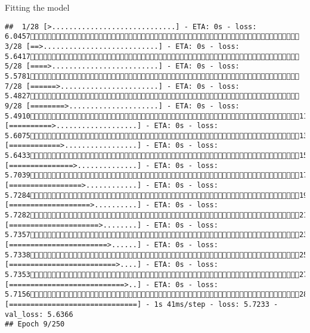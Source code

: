 \documentclass[
  ignorenonframetext,
]{beamer}
\begin{document}
\begin{frame}[fragile]{Fitting the model}
\begin{verbatim}
##  1/28 [>.............................] - ETA: 0s - loss: 6.0457 3/28 [==>...........................] - ETA: 0s - loss: 5.6417 5/28 [====>.........................] - ETA: 0s - loss: 5.5781 7/28 [======>.......................] - ETA: 0s - loss: 5.4827 9/28 [========>.....................] - ETA: 0s - loss: 5.491011/28 [==========>...................] - ETA: 0s - loss: 5.607513/28 [============>.................] - ETA: 0s - loss: 5.643315/28 [===============>..............] - ETA: 0s - loss: 5.703917/28 [=================>............] - ETA: 0s - loss: 5.728419/28 [===================>..........] - ETA: 0s - loss: 5.728221/28 [=====================>........] - ETA: 0s - loss: 5.735723/28 [=======================>......] - ETA: 0s - loss: 5.733825/28 [=========================>....] - ETA: 0s - loss: 5.735327/28 [===========================>..] - ETA: 0s - loss: 5.715628/28 [==============================] - 1s 41ms/step - loss: 5.7233 - val_loss: 5.6366
## Epoch 9/250

\end{verbatim}
\end{frame}
\end{document}
